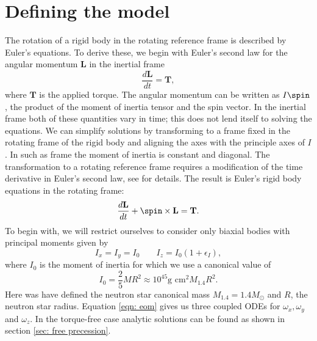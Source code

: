 \documentclass[/home/greg/Thesis/main/main.tex]{subfiles}
\begin{document}
\section{Defining the model}
\label{sec: defining the model}

The rotation of a rigid body in the rotating reference frame is described by
Euler's equations. To derive these, we begin with Euler's second law  for the
angular momentum $\mathbf{L}$ in the inertial frame
\begin{equation}
    \frac{d\mathbf{L}}{dt}=\mathbf{T},
\end{equation}
where $\mathbf{T}$ is the applied torque. The angular momentum can be written
as $I \spin$, the product of the moment of inertia tensor and the spin vector.
In the inertial frame both of these quantities vary in time; this does not lend
itself to solving the equations. We can simplify solutions by transforming to a
frame fixed in the rotating frame of the rigid body and aligning the axes with
the principle axes of $I$. In such as frame the moment of inertia is constant
and diagonal. The transformation to a rotating reference frame requires a
modification of the time derivative in Euler's second law, see \citet{Landau1969}
for details. The result is Euler's rigid body equations in the rotating frame:
\begin{equation}
    \frac{d\mathbf{L}}{dt} + \spin \times \mathbf{L} = \mathbf{T}.
    \label{eqn: eom}
\end{equation}
To begin with, we will restrict ourselves to consider only biaxial bodies with 
principal moments given by
\begin{equation}
I_{x} = I_{y} = I_{0} \;\;\;\;\;\;\; I_{z} = I_{0}(1+\epsilon_{I}),
\end{equation}
where $I_{0}$ is the moment of inertia for which we use a canonical value of 
\begin{equation}
I_{0} = \frac{2}{5}MR^{2} \approx 10^{45}\textrm{g cm}^{2} M_{1.4}R^{2}.
\end{equation}
Here was have defined the neutron star canonical mass $M_{1.4} = 1.4 M_{\odot}$ 
and $R$, the neutron star radius.
Equation \ref{eqn: eom} gives us three coupled ODEs for $\omega_{x}, 
\omega_{y}$ and $\omega_{z}$. In the torque-free case analytic solutions can be
found as shown in section \ref{sec: free precession}.
\end{document}
